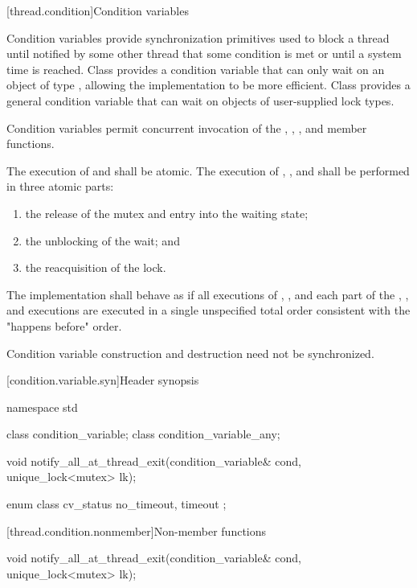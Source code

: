 [thread.condition]{Condition variables}

\pnum
Condition variables provide synchronization primitives used to block a thread until
notified by some other thread that some condition is met or until a system time is
reached. Class  provides a condition variable that can only
wait on an object of type , allowing the implementation
to be more efficient. Class  provides a general
condition variable that can wait on objects of user-supplied lock types.

\pnum
Condition variables permit concurrent invocation of the , ,
,  and  member functions.

\pnum
The execution of  and  shall be atomic. The
execution of , , and  shall be performed
in three atomic parts:

\begin{enumerate}
\item the release of the mutex and entry into the waiting state;
\item the unblocking of the wait; and
\item the reacquisition of the lock.
\end{enumerate}

\pnum
The implementation shall behave as if all executions of , , and each
part of the , , and  executions are
executed in a single unspecified total order consistent with the "happens before" order.

\pnum
Condition variable construction and destruction need not be synchronized.

[condition.variable.syn]{Header  synopsis}
%

%
\begin{codeblock}
namespace std {
  class condition_variable;
  class condition_variable_any;

  void notify_all_at_thread_exit(condition_variable& cond, unique_lock<mutex> lk);

  enum class cv_status { no_timeout, timeout };
}
\end{codeblock}

[thread.condition.nonmember]{Non-member functions}
%
\begin{itemdecl}
void notify_all_at_thread_exit(condition_variable& cond, unique_lock<mutex> lk);
\end{itemdecl}

